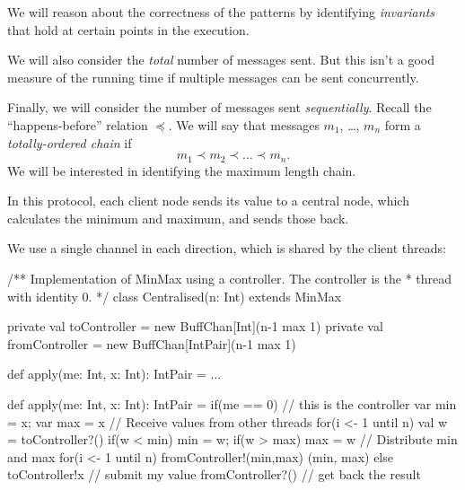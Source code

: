 \documentclass[notes,color]{sepslide0}
\begin{document}



\begin{slide}

We will reason about the correctness of the patterns by identifying
\emph{invariants} that hold at certain points in the execution.

We will also consider the \emph{total} number of messages sent.  But this
isn't a good measure of the running time if multiple messages can be sent
concurrently.

Finally, we will consider the number of messages sent \emph{sequentially}.
Recall the ``happens-before'' relation $\preceq$.  We will say that messages
$m_1$, \ldots, $m_n$ form a {\it totally-ordered chain} if
\[
m_1 \prec m_2 \prec \ldots \prec m_n.
\]
We will be interested in identifying the maximum length chain.
\end{slide}


\begin{slide}

In this protocol, each client node sends its value to a central node, which
calculates the minimum and maximum, and sends those back.

We use a single channel in each direction, which is shared by the client
threads: 
%
\begin{scala}
/** Implementation of MinMax using a controller.  The controller is the
  *  thread with identity 0. */
class Centralised(n: Int) extends MinMax{
  private val toController = new BuffChan[Int](n-1 max 1)
  private val fromController = new BuffChan[IntPair](n-1 max 1)

  def apply(me: Int, x: Int): IntPair = ...

}
\end{scala}
\end{slide}


\begin{slide}

\begin{scala}
  def apply(me: Int, x: Int): IntPair = {
    if(me == 0){ // this is the controller
      var min = x; var max = x
      // Receive values from other threads
      for(i <- 1 until n){
        val w = toController?()
        if(w < min) min = w; if(w > max) max = w
      }
      // Distribute min and max
      for(i <- 1 until n) fromController!(min,max)
      (min, max)
    }
    else{
      toController!x  // submit my value
      fromController?() // get back the result
    }
  }
\end{scala}
\end{slide}
\end{document}
